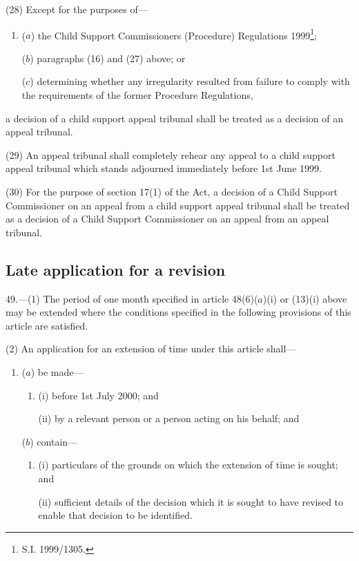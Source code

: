 \documentclass[12pt,a4paper]{article}
\begin{document}
(28) Except for the purposes of—
\begin{enumerate}\item[]
($a$) the Child Support Commissioners (Procedure) Regulations 1999\footnote{\frenchspacing S.I. 1999/1305.};

($b$) paragraphs (16) and (27) above; or

($c$) determining whether any irregularity resulted from failure to comply with the requirements of the former Procedure Regulations,
\end{enumerate}
a decision of a child support appeal tribunal shall be treated as a decision of an appeal tribunal.

(29) An appeal tribunal shall completely rehear any appeal to a child support appeal tribunal which stands adjourned immediately before 1st June 1999.

(30) For the purpose of section 17(1) of the Act, a decision of a Child Support Commissioner on an appeal from a child support appeal tribunal shall be treated as a decision of a Child Support Commissioner on an appeal from an appeal tribunal.

\subsection[49. Late application for a revision]{Late application for a revision}

49.—(1) The period of one month specified in article 48(6)($a$)(i) or (13)(i) above may be extended where the conditions specified in the following provisions of this article are satisfied.

(2) An application for an extension of time under this article shall—
\begin{enumerate}\item[]
($a$) be made—
\begin{enumerate}\item[]
(i) before 1st July 2000; and

(ii) by a relevant person or a person acting on his behalf; and
\end{enumerate}

($b$) contain—
\begin{enumerate}\item[]
(i) particulars of the grounds on which the extension of time is sought; and

(ii) sufficient details of the decision which it is sought to have revised to enable that decision to be identified.
\end{enumerate}
\end{enumerate}
\end{document}
